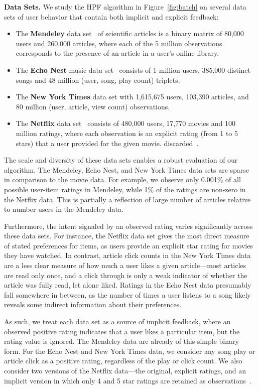 {\bf Data Sets.} We study the HPF algorithm in Figure~\ref{fig:batch}
on several data sets of user behavior that contain both implicit
and explicit feedback:
\begin{itemize}
\item The {\bf Mendeley} data set~\cite{Jack:2010} of scientific
  articles is a binary matrix of 80,000 users and 260,000 articles,
  where each of the 5 million observations corresponds to the presence
  of an article in a user's online library.
\item The {\bf Echo Nest} music data set~\cite{Bertin-Mahieux:2011}
  consists of 1 million users, 385,000 distinct songs and 48 million
  (user, song, play count) triplets.
\item The {\bf New York Times} data set with 1,615,675 users, 103,390
  articles, and 80 million (user, article, view count)
  observations.
\item The {\bf Netflix} data set~\cite{Koren:2009} consists of 480,000
  users, 17,770 movies and 100 million ratings, where each observation
  is an explicit rating (from 1 to 5 stars) that a user provided for
  the given movie.
  discarded~\cite{Paquet:2013p9197}.
\end{itemize}

The scale and diversity of these data sets enables a robust evaluation
of our algorithm. The Mendeley, Echo Nest, and New York Times data
sets are sparse in comparison to the movie data. For example, we
observe only 0.001\% of all possible user-item ratings in Mendeley,
while 1\% of the ratings are non-zero in the Netflix data. This is
partially a reflection of large number of articles relative to number
users in the Mendeley data.

Furthermore, the intent signaled by an observed rating varies
significantly across these data sets. For instance, the Netflix data
set gives the most direct measure of stated preferences for items, as
users provide an explicit star rating for movies they have watched. In
contrast, article click counts in the New York Times data are a less
clear measure of how much a user likes a given article---most articles
are read only once, and a click through is only a weak indicator of
whether the article was fully read, let alone liked. Ratings in the
Echo Nest data presumably fall somewhere in between, as the number of
times a user listens to a song likely reveals some indirect
information about their preferences.

As such, we treat each data set as a source of implicit feedback,
where an observed positive rating indicates that a user likes a
particular item, but the rating value is ignored. The Mendeley data
are already of this simple binary form. For the Echo Nest and New York
Times data, we consider any song play or article click as a positive
rating, regardless of the play or click count. We also consider two
versions of the Netflix data---the original, explicit ratings, and an
implicit version in which only 4 and 5 star ratings are retained as
observations~\cite{Paquet:2013p9197}.


